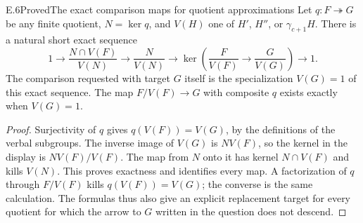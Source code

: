 \begin{statement}{E.6}{Proved}{The exact comparison maps for quotient approximations}
Let $q:F\twoheadrightarrow G$ be any finite quotient, $N=\ker q$,
and $V(H)$ one of $H'$, $H''$, or $\gamma_{c+1}H$.
There is a natural short exact sequence
\[
 1\longrightarrow\frac{N\cap V(F)}{V(N)}
 \longrightarrow\frac{N}{V(N)}
 \longrightarrow
 \ker\left(\frac{F}{V(F)}\longrightarrow\frac{G}{V(G)}\right)
 \longrightarrow1.
\]
The comparison requested with target $G$ itself is the specialization
$V(G)=1$ of this exact sequence. The map $F/V(F)\to G$ with
composite $q$ exists exactly when $V(G)=1$.
\end{statement}
\begin{proof}
Surjectivity of $q$ gives $q(V(F))=V(G)$, by the definitions of
the verbal subgroups. The inverse image of $V(G)$ is $NV(F)$,
so the kernel in the display is $NV(F)/V(F)$. The map from $N$
onto it has kernel $N\cap V(F)$ and kills $V(N)$.
This proves exactness and identifies every map. A factorization
of $q$ through $F/V(F)$ kills $q(V(F))=V(G)$; the converse is
the same calculation. The formulas thus also give an explicit
replacement target for every quotient for which the arrow to $G$
written in the question does not descend.
\end{proof}

